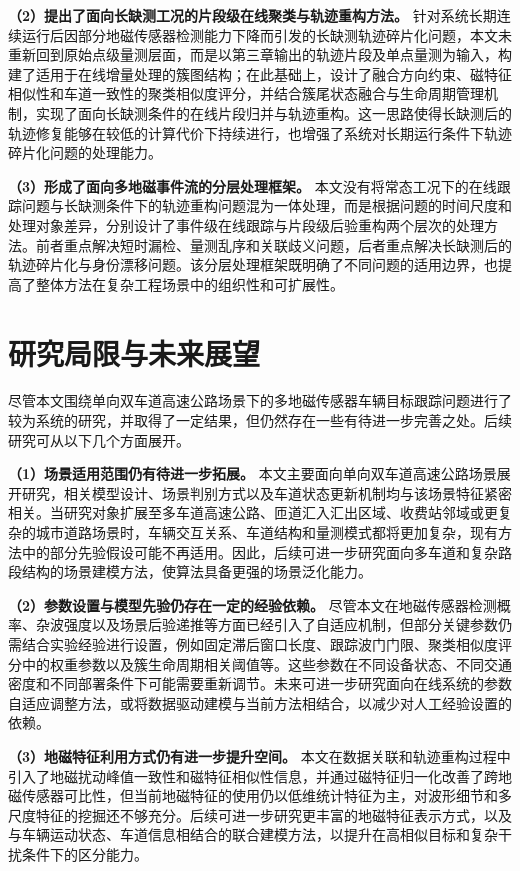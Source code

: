 \documentclass{xdupgthesis}
\begin{document}
\noindent\textbf{（2）提出了面向长缺测工况的片段级在线聚类与轨迹重构方法。} 针对系统长期连续运行后因部分地磁传感器检测能力下降而引发的长缺测轨迹碎片化问题，本文未重新回到原始点级量测层面，而是以第三章输出的轨迹片段及单点量测为输入，构建了适用于在线增量处理的簇图结构；在此基础上，设计了融合方向约束、磁特征相似性和车道一致性的聚类相似度评分，并结合簇尾状态融合与生命周期管理机制，实现了面向长缺测条件的在线片段归并与轨迹重构。这一思路使得长缺测后的轨迹修复能够在较低的计算代价下持续进行，也增强了系统对长期运行条件下轨迹碎片化问题的处理能力。

\noindent\textbf{（3）形成了面向多地磁事件流的分层处理框架。} 本文没有将常态工况下的在线跟踪问题与长缺测条件下的轨迹重构问题混为一体处理，而是根据问题的时间尺度和处理对象差异，分别设计了事件级在线跟踪与片段级后验重构两个层次的处理方法。前者重点解决短时漏检、量测乱序和关联歧义问题，后者重点解决长缺测后的轨迹碎片化与身份漂移问题。该分层处理框架既明确了不同问题的适用边界，也提高了整体方法在复杂工程场景中的组织性和可扩展性。

\section{研究局限与未来展望}

尽管本文围绕单向双车道高速公路场景下的多地磁传感器车辆目标跟踪问题进行了较为系统的研究，并取得了一定结果，但仍然存在一些有待进一步完善之处。后续研究可从以下几个方面展开。

\noindent\textbf{（1）场景适用范围仍有待进一步拓展。} 本文主要面向单向双车道高速公路场景展开研究，相关模型设计、场景判别方式以及车道状态更新机制均与该场景特征紧密相关。当研究对象扩展至多车道高速公路、匝道汇入汇出区域、收费站邻域或更复杂的城市道路场景时，车辆交互关系、车道结构和量测模式都将更加复杂，现有方法中的部分先验假设可能不再适用。因此，后续可进一步研究面向多车道和复杂路段结构的场景建模方法，使算法具备更强的场景泛化能力。

\noindent\textbf{（2）参数设置与模型先验仍存在一定的经验依赖。} 尽管本文在地磁传感器检测概率、杂波强度以及场景后验递推等方面已经引入了自适应机制，但部分关键参数仍需结合实验经验进行设置，例如固定滞后窗口长度、跟踪波门门限、聚类相似度评分中的权重参数以及簇生命周期相关阈值等。这些参数在不同设备状态、不同交通密度和不同部署条件下可能需要重新调节。未来可进一步研究面向在线系统的参数自适应调整方法，或将数据驱动建模与当前方法相结合，以减少对人工经验设置的依赖。

\noindent\textbf{（3）地磁特征利用方式仍有进一步提升空间。} 本文在数据关联和轨迹重构过程中引入了地磁扰动峰值一致性和磁特征相似性信息，并通过磁特征归一化改善了跨地磁传感器可比性，但当前地磁特征的使用仍以低维统计特征为主，对波形细节和多尺度特征的挖掘还不够充分。后续可进一步研究更丰富的地磁特征表示方式，以及与车辆运动状态、车道信息相结合的联合建模方法，以提升在高相似目标和复杂干扰条件下的区分能力。
\end{document}
